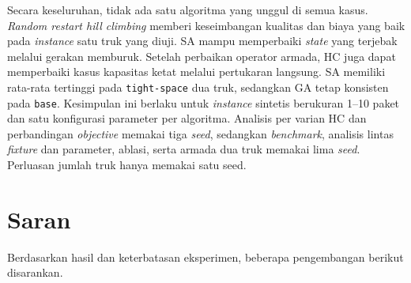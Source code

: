 Secara keseluruhan, tidak ada satu algoritma yang unggul di semua kasus. \textit{Random restart hill climbing} memberi keseimbangan kualitas dan biaya yang baik pada \textit{instance} satu truk yang diuji. SA mampu memperbaiki \textit{state} yang terjebak melalui gerakan memburuk. Setelah perbaikan operator armada, HC juga dapat memperbaiki kasus kapasitas ketat melalui pertukaran langsung. SA memiliki rata-rata tertinggi pada \texttt{tight-space} dua truk, sedangkan GA tetap konsisten pada \texttt{base}. Kesimpulan ini berlaku untuk \textit{instance} sintetis berukuran 1--10 paket dan satu konfigurasi parameter per algoritma. Analisis per varian HC dan perbandingan \textit{objective} memakai tiga \textit{seed}, sedangkan \textit{benchmark}, analisis lintas \textit{fixture} dan parameter, ablasi, serta armada dua truk memakai lima \textit{seed}. Perluasan jumlah truk hanya memakai satu seed.

\section{Saran}

Berdasarkan hasil dan keterbatasan eksperimen, beberapa pengembangan berikut disarankan.

